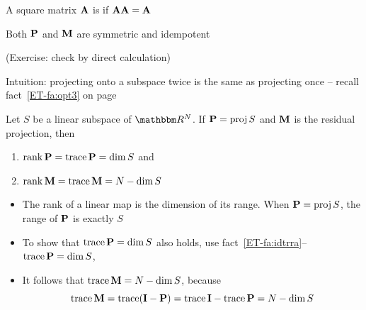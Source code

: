 \begin{frame}
    
    \vspace{2em}
    A square matrix $\mathbf A$ is  if $\mathbf A \mathbf A = \mathbf A$ 
    
    \vspace{.7em}
    \Fact{\eqref{ET-fa:pmsi}}
        Both $\mathbf P$ and $\mathbf M$ are symmetric and idempotent
    
    (Exercise: check by direct calculation)
    
    \vspace{.7em}
    Intuition: projecting
    onto a subspace twice is the same as projecting once -- recall fact~\ref{ET-fa:opt3} on page~\pageref{ET-fa:opt3}
    
\end{frame}

\begin{frame}
    
    \vspace{2em}
    \Fact{\eqref{ET-fa:trop}}
    Let $S$ be a linear subspace of $\RR^N$. If $\mathbf P = \operatorname{proj} S$ and 
    $\mathbf M$ is the residual projection, then 
    \begin{enumerate}
        \item $\operatorname{rank} \mathbf P  = \operatorname{trace} \mathbf P  = \dim S$ and
        \item $\operatorname{rank} \mathbf M  = \operatorname{trace} \mathbf M  = N - \dim S$
    \end{enumerate}
  
  
    \Prf
    \begin{itemize}
        \item The rank of a linear
            map is the dimension of its range.  When $\mathbf P = \operatorname{proj} S$, the range of
            $\mathbf P$ is exactly $S$
        \item To show that $\operatorname{trace} \mathbf P = \dim S$ also holds, use
                fact~\ref{ET-fa:idtrra}--  $\operatorname{trace}\mathbf P
                = \dim S$, 
        \item It follows that $\operatorname{trace}\mathbf M = N - \dim S$, because
            \begin{equation*}
                \operatorname{trace}\mathbf M 
                = \operatorname{trace}(\mathbf I - \mathbf P) 
                = \operatorname{trace} \mathbf I - \operatorname{trace}\mathbf P 
                = N - \dim S
            \end{equation*}

    \end{itemize}
  
\end{frame}


